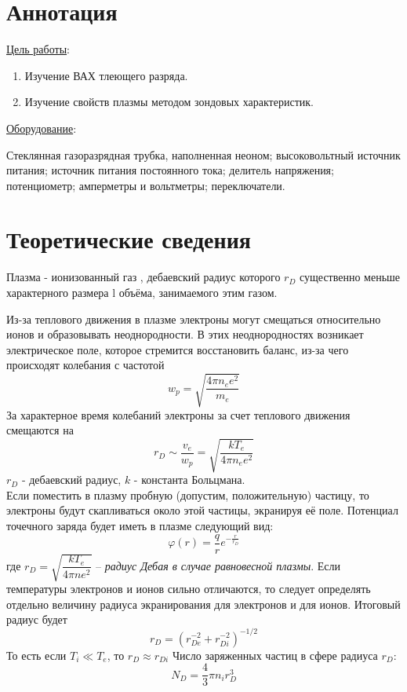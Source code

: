 \section{Аннотация}

\underline{Цель работы}: 
\begin{enumerate}
    \item Изучение ВАХ тлеющего разряда.
    \item Изучение свойств плазмы методом зондовых характеристик.
\end{enumerate} \par
\underline{Оборудование}:
\par Стеклянная газоразрядная трубка, наполненная неоном; высоковольтный источник питания; источник питания постоянного тока; делитель напряжения; потенциометр; амперметры и вольтметры; переключатели.
\section{Теоретические сведения}
\par Плазма - ионизованный газ , дебаевский радиус которого $r_D$ существенно меньше характерного размера l объёма, занимаемого этим газом.
\par  Из-за теплового движения в плазме электроны могут смещаться относительно ионов и образовывать неоднородности. В этих неоднородностях возникает электрическое поле, которое стремится восстановить баланс, из-за чего происходят колебания с частотой 
\begin{equation}
 w_p = \sqrt{\frac{4\pi n_e e^2}{m_e}}
\end{equation}	
	За характерное время колебаний электроны за счет теплового движения смещаются на 
\begin{equation}
    r_D \sim \frac{v_e}{w_p} = \sqrt{\frac{kT_e}{4\pi n_e e^2}}
\end{equation}
	$r_D$ - дебаевский радиус, $k$ - константа Больцмана.\\
	Если поместить в плазму пробную (допустим, положительную) частицу, то электроны будут скапливаться около этой частицы, экранируя её поле. Потенциал точечного заряда будет иметь в плазме следующий вид:
	\[\varphi(r) = \frac{q}{r}e^{-\frac{r}{r_D}}\]
	где $r_D = \sqrt{\dfrac{kT_e}{4\pi n e^2}}$ -- \textit{радиус Дебая в случае равновесной плазмы}. Если температуры электронов и ионов сильно отличаются, то следует определять отдельно величину радиуса экранирования для электронов и для ионов. Итоговый радиус будет
	\[r_D = (r_{De}^{-2} + r_{Di}^{-2})^{-1/2}\]
	То есть если $T_i \ll T_e$, то $r_D \approx r_{Di}$ 
     Число заряженных частиц в сфере радиуса $r_D$:
     \begin{equation}
         N_D = \frac{4}{3}\pi n_i r^3_D
     \end{equation}


